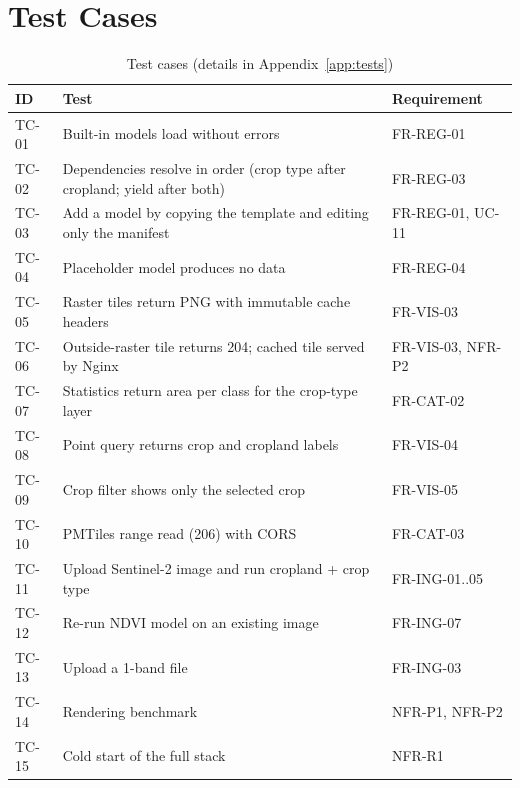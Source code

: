 \section{Test Cases}
\begin{table}[htbp]
\centering\small
\caption{Test cases (details in Appendix~\ref{app:tests})}
\label{tab:testcases}
\begin{tabularx}{\textwidth}{L{1.1cm} Y L{2.0cm}}
\toprule
\textbf{ID} & \textbf{Test} & \textbf{Requirement}\\
\midrule
TC-01 & Built-in models load without errors & FR-REG-01\\
TC-02 & Dependencies resolve in order (crop type after cropland; yield after both) & FR-REG-03\\
TC-03 & Add a model by copying the template and editing only the manifest & FR-REG-01, UC-11\\
TC-04 & Placeholder model produces no data & FR-REG-04\\
TC-05 & Raster tiles return PNG with immutable cache headers & FR-VIS-03\\
TC-06 & Outside-raster tile returns 204; cached tile served by Nginx & FR-VIS-03, NFR-P2\\
TC-07 & Statistics return area per class for the crop-type layer & FR-CAT-02\\
TC-08 & Point query returns crop and cropland labels & FR-VIS-04\\
TC-09 & Crop filter shows only the selected crop & FR-VIS-05\\
TC-10 & PMTiles range read (206) with CORS & FR-CAT-03\\
TC-11 & Upload Sentinel-2 image and run cropland + crop type & FR-ING-01..05\\
TC-12 & Re-run NDVI model on an existing image & FR-ING-07\\
TC-13 & Upload a 1-band file & FR-ING-03\\
TC-14 & Rendering benchmark & NFR-P1, NFR-P2\\
TC-15 & Cold start of the full stack & NFR-R1\\
\bottomrule
\end{tabularx}
\end{table}

